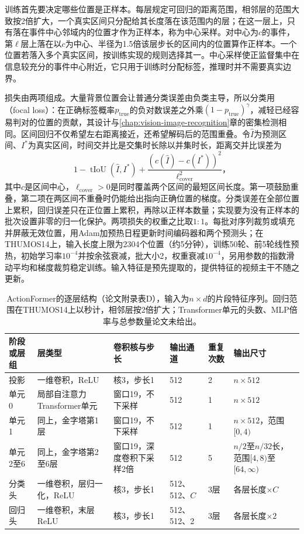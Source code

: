 训练首先要决定哪些位置是正样本。每层规定可回归的距离范围，相邻层的范围大致按2倍扩大，一个真实区间只分配给其长度落在该范围内的层；在这一层上，只有落在事件中心邻域内的位置才作为正样本，称为中心采样。对中心为$c$的事件，第$\ell$层上落在以$c$为中心、半径为1.5倍该层步长的区间内的位置算作正样本。一个位置若落入多个真实区间，按训练实现的规则选择其一。中心采样使正监督集中在信息较充分的事件中心附近，它只用于训练时分配标签，推理时并不需要真实边界。

损失由两项组成。大量背景位置会让普通分类误差由负类主导，所以分类用（focal loss）：在正确标签概率$p_{\mathrm{true}}$的负对数误差之外乘$(1-p_{\mathrm{true}})^\gamma$，减轻已经容易判对的位置的贡献，其设计与\ref{chap:vision-image-recognition}章的密集检测相同。区间回归不仅希望左右距离接近，还希望解码后的范围重叠。令$\widehat{I}$为预测区间、$I^*$为真实区间，时间交并比是交集时长除以并集时长，距离交并比误差为
\[
  1-\operatorname{tIoU}(\widehat{I},I^*)+\frac{(c(\widehat{I})-c(I^*))^2}{\ell_{\mathrm{cover}}^2}\text{，}
\]
其中$c$是区间中心，$\ell_{\mathrm{cover}}>0$是同时覆盖两个区间的最短区间长度。第一项鼓励重叠，第二项在两区间不重叠时仍能给出指向正确位置的梯度。分类误差在全部位置上累积，回归误差只在正位置上累积，再除以正样本数量；实现要为没有正样本的批次设置非零的归一化保护。两项损失的权重之比取$1:1$。每批对序列裁剪或填充并屏蔽无效位置，用Adam加预热日程更新时间编码器和两个预测头；在THUMOS14上，输入长度上限为2304个位置（约5分钟），训练50轮、前5轮线性预热，初始学习率$10^{-4}$并按余弦衰减，批大小2，权重衰减$10^{-4}$，另用参数的指数滑动平均和梯度裁剪稳定训练。输入特征是预先提取的，提供特征的视频主干不随之更新。

\begin{table}[tbp]
  \centering
  \small
  \begin{tabularx}{\linewidth}{@{}lXXllX@{}}
    \toprule
    阶段或层组 & 层类型 & 卷积核与步长 & 输出通道 & 重复次数 & 输出尺寸\\
    \midrule
    投影 & 一维卷积，ReLU & 核3，步长1 & 512 & 2 & $n\times512$\\
    单元0 & 局部自注意力Transformer单元 & 窗口19，不下采样 & 512 & 1 & $n\times512$\\
    单元1 & 同上，金字塔第1层 & 窗口19，不下采样 & 512 & 1 & $n\times512$，范围$[0,4)$\\
    单元2至6 & 同上，金字塔第2至6层 & 窗口19，深度卷积下采样2倍 & 512 & 5 & $n/2$至$n/32$长，范围$[4,8)$至$[64,\infty)$\\
    分类头 & 一维卷积，层归一化，ReLU & 核3，步长1 & 512、512、$C$ & 3层 & 各层长度$\times C$\\
    回归头 & 一维卷积，末层ReLU & 核3，步长1 & 512、512、2 & 3层 & 各层长度$\times2$\\
    \bottomrule
  \end{tabularx}
  \caption{ActionFormer的逐层结构（论文附录表D），输入为$n\times d$的片段特征序列。回归范围在THUMOS14上以秒计，相邻层按2倍扩大；Transformer单元的头数、MLP倍率与总参数量论文未给出。}
  \label{tab:vision-video-actionformer-arch}
\end{table}


